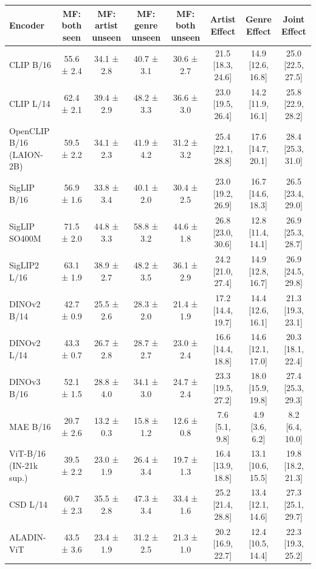 \begin{tabular}{lccccccc}
\toprule
Encoder & MF: both seen & MF: artist unseen & MF: genre unseen & MF: both unseen & Artist Effect & Genre Effect & Joint Effect \\
\midrule
CLIP B/16 & 55.6 ± 2.4 & 34.1 ± 2.8 & 40.7 ± 3.1 & 30.6 ± 2.7 & 21.5 [18.3, 24.6] & 14.9 [12.6, 16.8] & 25.0 [22.5, 27.5] \\
CLIP L/14 & 62.4 ± 2.1 & 39.4 ± 2.9 & 48.2 ± 3.3 & 36.6 ± 3.0 & 23.0 [19.5, 26.4] & 14.2 [11.9, 16.1] & 25.8 [22.9, 28.2] \\
OpenCLIP B/16 (LAION-2B) & 59.5 ± 2.2 & 34.1 ± 2.3 & 41.9 ± 4.2 & 31.2 ± 3.2 & 25.4 [22.1, 28.8] & 17.6 [14.7, 20.1] & 28.4 [25.3, 31.0] \\
SigLIP B/16 & 56.9 ± 1.6 & 33.8 ± 3.4 & 40.1 ± 2.0 & 30.4 ± 2.5 & 23.0 [19.2, 26.9] & 16.7 [14.6, 18.3] & 26.5 [23.4, 29.0] \\
SigLIP SO400M & 71.5 ± 2.0 & 44.8 ± 3.3 & 58.8 ± 3.2 & 44.6 ± 1.8 & 26.8 [23.0, 30.6] & 12.8 [11.4, 14.1] & 26.9 [25.3, 28.7] \\
SigLIP2 L/16 & 63.1 ± 1.9 & 38.9 ± 2.7 & 48.2 ± 3.5 & 36.1 ± 2.9 & 24.2 [21.0, 27.4] & 14.9 [12.8, 16.7] & 26.9 [24.5, 29.8] \\
DINOv2 B/14 & 42.7 ± 0.9 & 25.5 ± 2.6 & 28.3 ± 2.0 & 21.4 ± 1.9 & 17.2 [14.4, 19.7] & 14.4 [12.6, 16.1] & 21.3 [19.3, 23.1] \\
DINOv2 L/14 & 43.3 ± 0.7 & 26.7 ± 2.8 & 28.7 ± 2.7 & 23.0 ± 2.4 & 16.6 [14.4, 18.8] & 14.6 [12.1, 17.0] & 20.3 [18.1, 22.4] \\
DINOv3 B/16 & 52.1 ± 1.5 & 28.8 ± 4.0 & 34.1 ± 3.0 & 24.7 ± 2.4 & 23.3 [19.5, 27.2] & 18.0 [15.9, 19.8] & 27.4 [25.3, 29.3] \\
MAE B/16 & 20.7 ± 2.6 & 13.2 ± 0.3 & 15.8 ± 1.2 & 12.6 ± 0.8 & 7.6 [5.1, 9.8] & 4.9 [3.6, 6.2] & 8.2 [6.4, 10.0] \\
ViT-B/16 (IN-21k sup.) & 39.5 ± 2.2 & 23.0 ± 1.9 & 26.4 ± 3.4 & 19.7 ± 1.3 & 16.4 [13.9, 18.8] & 13.1 [10.6, 15.5] & 19.8 [18.2, 21.3] \\
CSD L/14 & 60.7 ± 2.3 & 35.5 ± 2.8 & 47.3 ± 3.4 & 33.4 ± 1.6 & 25.2 [21.4, 28.8] & 13.4 [12.1, 14.6] & 27.3 [25.1, 29.7] \\
ALADIN-ViT & 43.5 ± 3.6 & 23.4 ± 1.9 & 31.2 ± 2.5 & 21.3 ± 1.0 & 20.2 [16.9, 22.7] & 12.4 [10.5, 14.4] & 22.3 [19.3, 25.2] \\
\bottomrule
\end{tabular}
